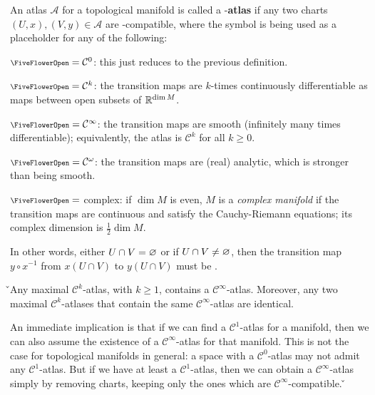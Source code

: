 An atlas $\mathscr{A}$ for a topological manifold is called a {\scalebox{0.75}\FiveFlowerOpen}-\textbf{atlas} if any
two charts $(U,x), (V,y) \in \mathscr{A}$ are {\scalebox{0.75}\FiveFlowerOpen}-compatible, where the symbol
{\scalebox{0.75}\FiveFlowerOpen} is being used as a placeholder for any of the following:
\bit
\item ${\scalebox{0.75}\FiveFlowerOpen} = \mathcal{C}^0$: this just reduces to the previous definition.
\item ${\scalebox{0.75}\FiveFlowerOpen} = \mathcal{C}^k$: the transition maps are $k$-times continuously differentiable
as maps between open subsets of $\mathbb{R}^{\dim M}$.
\item ${\scalebox{0.75}\FiveFlowerOpen} = \mathcal{C}^\infty$: the transition maps are smooth (infinitely many times
differentiable); equivalently, the atlas is $\mathcal{C}^k$ for all $k\geq 0$.
\item ${\scalebox{0.75}\FiveFlowerOpen} = \mathcal{C}^\omega$: the transition maps are (real) analytic, which is
stronger than being smooth.
\item ${\scalebox{0.75}\FiveFlowerOpen} =$ complex: if $\dim M$ is even, $M$ is a \emph{complex manifold} if the
transition maps are continuous and satisfy the Cauchy-Riemann equations; its complex dimension is $\tfrac{1}{2}\dim M$.
\eit

\ed

In other words, either $U\cap V = \varnothing$ or if $U\cap V \neq \varnothing$, then the transition map $y\circ x^{-1}$ from
$x(U\cap V)$ to $y(U\cap V)$ must be {\scalebox{0.75}\FiveFlowerOpen}.

\bse
{}
\ese

\v

\bt[Whitney] Any maximal $\mathcal{C}^k$-atlas, with $k\geq 1$, contains a $\mathcal{C}^\infty$-atlas. Moreover, any
two maximal $\mathcal{C}^k$-atlases that contain the same $\mathcal{C}^\infty$-atlas are identical.
\et

An immediate implication is that if we can find a $\mathcal{C}^1$-atlas for a manifold, then we can also assume the
existence of a $\mathcal{C}^\infty$-atlas for that manifold. This is not the case for topological manifolds in
general: a space with a $\mathcal{C}^0$-atlas may not admit any $\mathcal{C}^1$-atlas. But if we have at least a
$\mathcal{C}^1$-atlas, then we can obtain a $\mathcal{C}^\infty$-atlas simply by removing charts, keeping only the
ones which are $\mathcal{C}^\infty$-compatible. \v

